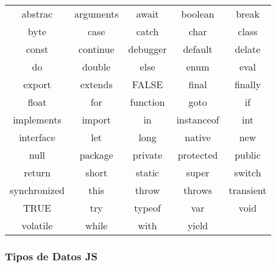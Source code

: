 \begin{center}
    \begin{tabular}{ccccc}
        abstrac      & arguments & await    & boolean    & break     \\
        byte         & case      & catch    & char       & class     \\
        const        & continue  & debugger & default    & delate    \\
        do           & double    & else     & enum       & eval      \\
        export       & extends   & FALSE    & final      & finally   \\
        float        & for       & function & goto       & if        \\
        implements   & import    & in       & instanceof & int       \\
        interface    & let       & long     & native     & new       \\
        null         & package   & private  & protected  & public    \\
        return       & short     & static   & super      & switch    \\
        synchronized & this      & throw    & throws     & transient \\
        TRUE         & try       & typeof   & var        & void      \\
        volatile     & while     & with     & yield      &          
        \end{tabular}\end{center}

\subsubsection*{Tipos de Datos JS}


